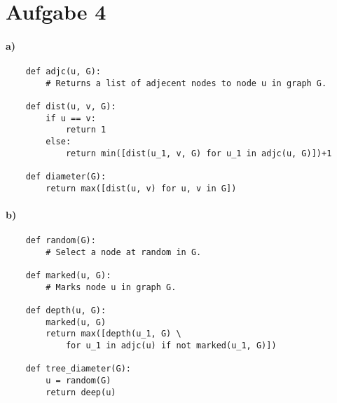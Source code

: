 \documentclass[a4paper,10pt]{scrartcl}
\begin{document}
\section*{Aufgabe 4}

\paragraph{a)}

\begin{verbatim}
    def adjc(u, G):
        # Returns a list of adjecent nodes to node u in graph G.

    def dist(u, v, G):
        if u == v:
            return 1
        else:
            return min([dist(u_1, v, G) for u_1 in adjc(u, G)])+1

    def diameter(G):
        return max([dist(u, v) for u, v in G])
\end{verbatim}

\paragraph{b)}

\begin{verbatim}
    def random(G):
        # Select a node at random in G.

    def marked(u, G):
        # Marks node u in graph G.

    def depth(u, G):
        marked(u, G)
        return max([depth(u_1, G) \
            for u_1 in adjc(u) if not marked(u_1, G)])

    def tree_diameter(G):
        u = random(G)
        return deep(u)
\end{verbatim}
\end{document}
